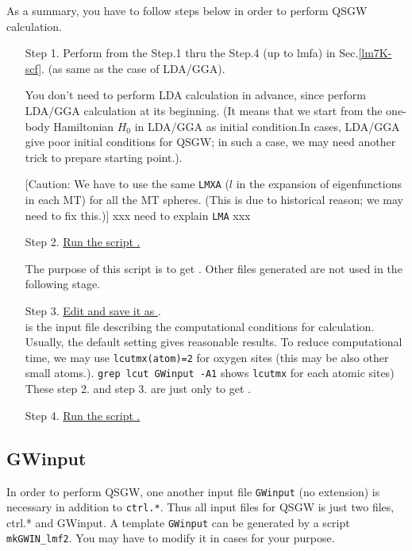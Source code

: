 As a summary, you have to follow steps below in order to perform QSGW calculation.
\begin{enumerate}
\item[Step 1.] 
Perform from the Step.1 thru the Step.4 (up to lmfa) in Sec.\ref{lm7K-scf}.
(as same as the case of LDA/GGA).

You don't need to perform LDA calculation in advance,
since  perform LDA/GGA calculation at its beginning.
(It means that we start from the one-body Hamiltonian $H_0$ in LDA/GGA as initial condition.In cases, LDA/GGA give poor initial conditions for QSGW; in such a case,
we may need another trick to prepare starting point.).

[Caution: We have to use the same \verb#LMXA# ($l$ in the expansion of eigenfunctions 
in each MT) for all the MT spheres. (This is due to historical reason;
we may need to fix this.)]
xxx need to explain \verb#LMA# xxx

\item[Step 2.]\underline{Run the script .}

The purpose of this script is to get .
Other files generated are not used in the following stage.

\item[Step 3.]\underline{Edit  and save it as }.\\
 is the input file describing the computational 
conditions for \GW calculation. 
Usually, the default setting gives reasonable results.
To reduce computational time, we may
use \verb#lcutmx(atom)=2# for oxygen sites 
(this may be also other small atoms.).
\verb#grep lcut GWinput -A1# shows \verb#lcutmx# for each atomic sites)
These step 2. and step 3. are just only to get .

\item[Step 4.]\underline{ Run the script .}
\end{enumerate}


\subsection{GWinput}
\label{GWinput}
In order to perform QSGW, one another input file 
\verb+GWinput+ (no extension) is necessary in addition to \verb+ctrl.*+.
Thus all input files for QSGW is just two files, ctrl.* and GWinput.
A template \verb+GWinput+ can be generated by a script \verb+mkGWIN_lmf2+. 
You may have to modify it in cases for your purpose.\\

